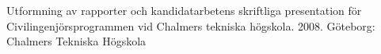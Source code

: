 \begin{thebibliography}{FFF}


 Utformning av rapporter och kandidatarbetens 
skriftliga presentation för Civilingenjörsprogrammen vid Chalmers 
tekniska högskola. 2008. Göteborg: Chalmers Tekniska Högskola
\end{thebibliography}